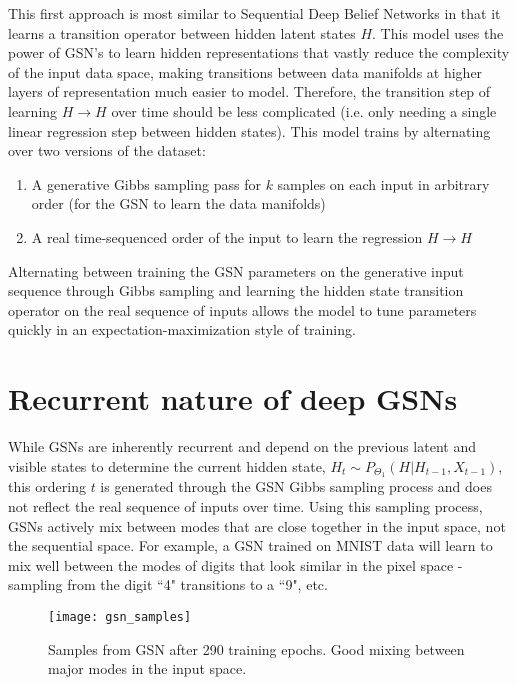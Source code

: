 This first approach is most similar to Sequential Deep Belief Networks in that it learns a transition operator between hidden latent states \(H\). This model uses the power of GSN's to learn hidden representations that vastly reduce the complexity of the input data space, making transitions between data manifolds at higher layers of representation much easier to model. Therefore, the transition step of learning \(H \rightarrow H\) over time should be less complicated (i.e. only needing a single linear regression step between hidden states). This model trains by alternating over two versions of the dataset:
\begin{enumerate}
\item A generative Gibbs sampling pass for \(k\) samples on each input in arbitrary order (for the GSN to learn the data manifolds)
\item A real time-sequenced order of the input to learn the regression \(H \rightarrow H\)
\end{enumerate}
Alternating between training the GSN parameters on the generative input sequence through Gibbs sampling and learning the hidden state transition operator on the real sequence of inputs allows the model to tune parameters quickly in an expectation-maximization style of training.



\section{Recurrent nature of deep GSNs}

While GSNs are inherently recurrent and depend on the previous latent and visible states to determine the current hidden state, \(H_{t} \sim P_{\Theta_1}(H|H_{t-1},X_{t-1})\), this ordering \(t\) is generated through the GSN Gibbs sampling process and does not reflect the real sequence of inputs over time. Using this sampling process, GSNs actively mix between modes that are close together in the input space, not the sequential space. For example, a GSN trained on MNIST data will learn to mix well between the modes of digits that look similar in the pixel space - sampling from the digit ``4" transitions to a ``9", etc.

\begin{figure}[h!]
  \centering
    \texttt{[image: gsn\_samples]}
\caption{Samples from GSN after 290 training epochs. Good mixing between major modes in the input space.}
\end{figure}

